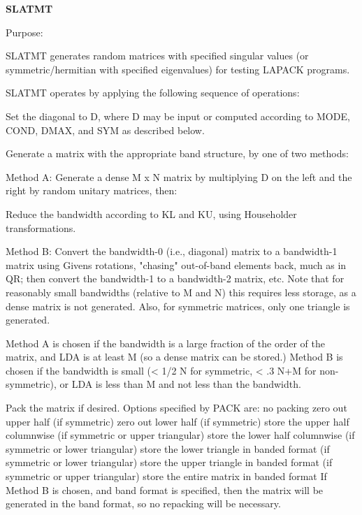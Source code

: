 {\bfseries S\+L\+A\+T\+M\+T} 

\begin{DoxyParagraph}{Purpose\+: }
\begin{DoxyVerb}    SLATMT generates random matrices with specified singular values
    (or symmetric/hermitian with specified eigenvalues)
    for testing LAPACK programs.

    SLATMT operates by applying the following sequence of
    operations:

      Set the diagonal to D, where D may be input or
         computed according to MODE, COND, DMAX, and SYM
         as described below.

      Generate a matrix with the appropriate band structure, by one
         of two methods:

      Method A:
          Generate a dense M x N matrix by multiplying D on the left
              and the right by random unitary matrices, then:

          Reduce the bandwidth according to KL and KU, using
          Householder transformations.

      Method B:
          Convert the bandwidth-0 (i.e., diagonal) matrix to a
              bandwidth-1 matrix using Givens rotations, "chasing"
              out-of-band elements back, much as in QR; then
              convert the bandwidth-1 to a bandwidth-2 matrix, etc.
              Note that for reasonably small bandwidths (relative to
              M and N) this requires less storage, as a dense matrix
              is not generated.  Also, for symmetric matrices, only
              one triangle is generated.

      Method A is chosen if the bandwidth is a large fraction of the
          order of the matrix, and LDA is at least M (so a dense
          matrix can be stored.)  Method B is chosen if the bandwidth
          is small (< 1/2 N for symmetric, < .3 N+M for
          non-symmetric), or LDA is less than M and not less than the
          bandwidth.

      Pack the matrix if desired. Options specified by PACK are:
         no packing
         zero out upper half (if symmetric)
         zero out lower half (if symmetric)
         store the upper half columnwise (if symmetric or upper
               triangular)
         store the lower half columnwise (if symmetric or lower
               triangular)
         store the lower triangle in banded format (if symmetric
               or lower triangular)
         store the upper triangle in banded format (if symmetric
               or upper triangular)
         store the entire matrix in banded format
      If Method B is chosen, and band format is specified, then the
         matrix will be generated in the band format, so no repacking
         will be necessary.\end{DoxyVerb}
 
\end{DoxyParagraph}

